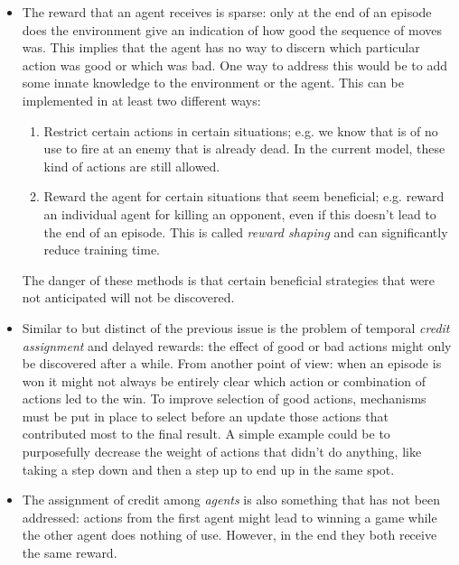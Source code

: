\begin{itemize}
    \item The reward that an agent receives is sparse: only at the end of an episode does the environment give an indication of how good the sequence of moves was. This implies that the agent has no way to discern which particular action was good or which was bad. One way to address this would be to add some innate knowledge to the environment or the agent. This can be implemented in at least two different ways:
    \begin{enumerate}
        \item Restrict certain actions in certain situations; e.g. we know that is of no use to fire at an enemy that is already dead. In the current model, these kind of actions are still allowed.
        \item Reward the agent for certain situations that seem beneficial; e.g. reward an individual agent for killing an opponent, even if this doesn't lead to the end of an episode. This is called \emph{reward shaping} and can significantly reduce training time.
    \end{enumerate}
    The danger of these methods is that certain beneficial strategies that were not anticipated will not be discovered.
    \item Similar to but distinct of the previous issue is the problem of temporal \emph{credit assignment} and delayed rewards: the effect of good or bad actions might only be discovered after a while. From another point of view: when an episode is won it might not always be entirely clear which action or combination of actions led to the win. To improve selection of good actions, mechanisms must be put in place to select before an update those actions that contributed most to the final result. A simple example could be to purposefully decrease the weight of actions that didn't do anything, like taking a step down and then a step up to end up in the same spot.
    \item The assignment of credit among \emph{agents} is also something that has not been addressed: actions from the first agent might lead to winning a game while the other agent does nothing of use. However, in the end they both receive the same reward.
\end{itemize}

